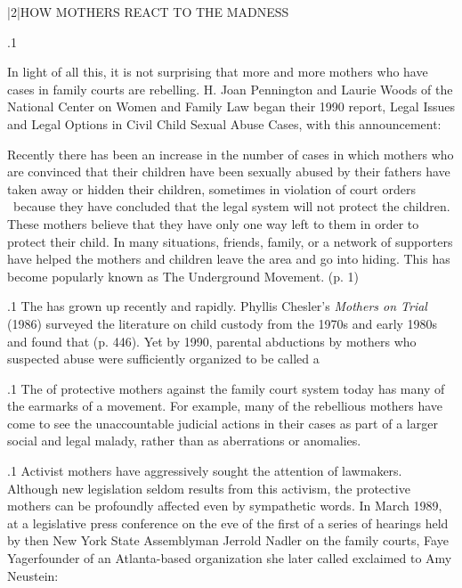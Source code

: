 \documentclass[11pt, twoside]{article}
\begin{document}
{\s|2|{HOW MOTHERS REACT TO THE MADNESS}

\p.1{%
\noindent{}In light of all this, it is not surprising that more and more mothers who
have cases in family courts are rebelling. H. Joan Pennington and Laurie
Woods of the National Center on Women and Family Law began their
1990 report, Legal Issues and Legal Options in Civil Child Sexual Abuse
Cases, with this announcement:

\begin{blockQuote}
Recently there has been an increase in the number of cases in which
mothers who are convinced that their children have been sexually
abused by their fathers have taken away or hidden their children,
sometimes in violation of court orders \ellThree{2pt}{2pt}\ because they have concluded that the legal system will not protect the children. These
mothers believe that they have only one way left to them in order
to protect their child. In many situations, friends, family, or a network of supporters have helped the mothers and children leave the
area and go into hiding. This has become popularly known as The
Underground Movement. (p. 1)
\end{blockQuote}

}%

\p.1{%
The  has grown up recently and rapidly.
Phyllis Chesler’s \textit{Mothers on Trial} (1986) surveyed the literature on child
custody from the 1970s and early 1980s and found that  (p. 446). Yet by 1990, parental
abductions by mothers who suspected abuse were sufficiently organized
to be called a 
}%

\p.1{%
The  of protective mothers against the family court system
today has many of the earmarks of a movement. For example, many of
the rebellious mothers have come to see the unaccountable judicial actions in their cases as part of a larger social and legal malady, rather than
as aberrations or anomalies.
}%

\p.1{%
Activist mothers have aggressively sought the attention of lawmakers. Although new legislation seldom results from this activism, the
protective mothers can be profoundly affected even by sympathetic
words. In March 1989, at a legislative press conference on the eve of the
first of a series of hearings held by then New York State Assemblyman
Jerrold Nadler on the family courts, Faye Yager\mdash{}founder of an
Atlanta-based organization she later called \mdash{}exclaimed to Amy Neustein: 
}%

}
\end{document}
